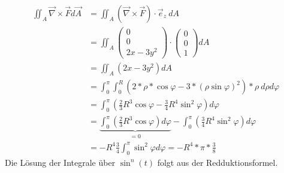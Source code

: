 \documentclass[a4paper]{article}
\begin{document}
\begin{align*}
	\iint_{A} \vec \nabla \times \vec F d\vec A &= 
	\iint_{A} \left( \vec \nabla \times \vec F\right) \cdot  \vec e_z \ dA \\
	&= \iint_{A}
	\begin{pmatrix} 0 \\ 0 \\ 2x - 3y^2 \end{pmatrix} \cdot
	\begin{pmatrix} 0 \\ 0 \\ 1 \end{pmatrix} dA \\
	&= \iint_{A} \left( 2x - 3y^2 \right) dA \\
	&= \int_0^\pi \int_0^R 
	\left(
		2 * \rho * \cos\varphi - 
		3 * (\rho \sin\varphi)^2
	\right) * \rho \
	d\rho d\varphi \\
	&= \int_0^\pi 
	\left(
		\frac 2 3 R^3 \cos\varphi - 
		\frac 3 4 R^4 \sin^2\varphi
	\right)
	d\varphi \\
	&= 
	\underbrace{\int_0^\pi 
	\left(
		\frac 2 3 R^3 \cos\varphi
	\right)
	d\varphi}_{= 0}
	-
	\int_0^\pi
	\left(
		\frac 3 4 R^4 \sin^2\varphi
	\right)
	d\varphi \\
	&= -R^4 \frac 3 4 \int_0^\pi \sin^2\varphi d\varphi = -R^4 * \pi *
	\frac 3 8
\end{align*}
Die Lösung der Integrale über $\sin^n(t)$ folgt aus der Redduktionsformel.
\end{document}
